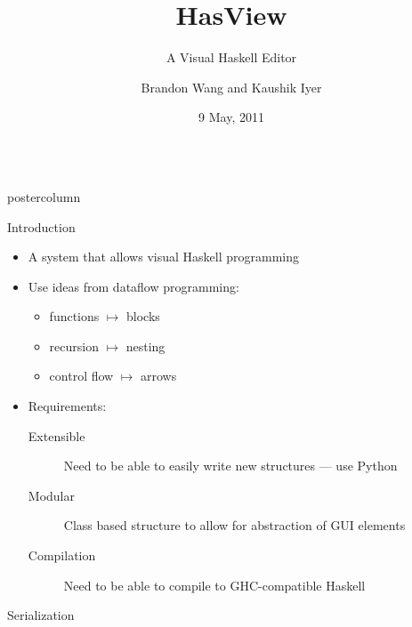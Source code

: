 \documentclass[final]{beamer}
\title{\huge HasView}
\subtitle{\LARGE A Visual Haskell Editor}
\institute{University of California at Berkeley}
\author{Brandon Wang and Kaushik Iyer}
\date{9 May, 2011}
\newlength{\columnheight}
\begin{document}
\begin{frame}[fragile]
    \begin{columns}[T]
        \begin{column}{.3\textwidth}
            \begin{beamercolorbox}[wd=\textwidth]{postercolumn}
                        \begin{block}{Introduction}
                            \begin{itemize}
                                \item A system that allows \alert{visual} Haskell programming
                                \item Use ideas from \alert{dataflow programming}:
                                    \begin{itemize}
                                        \item functions $\mapsto$ blocks
                                        \item recursion $\mapsto$ nesting
                                        \item control flow $\mapsto$ arrows
                                    \end{itemize}
                                \item Requirements:
                                    \begin{description}
                                        \item[Extensible] \hfill Need to be able to easily write new structures --- use Python
                                        \item[Modular] \hfill Class based structure to allow for abstraction of GUI elements
                                        \item[Compilation] \hfill Need to be able to compile to GHC-compatible Haskell
                                    \end{description}
                            \end{itemize}
                        \end{block}
                \begin{block}{Serialization}

\end{block}
\end{beamercolorbox}
\end{column}
\end{columns}
\end{frame}
\end{document}
